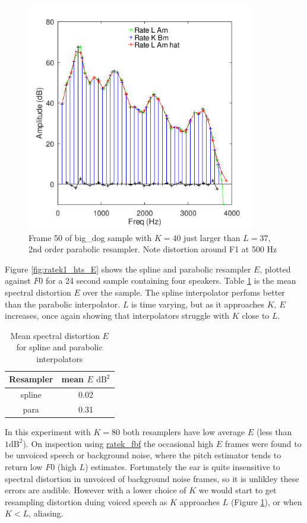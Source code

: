 \documentclass{article}
\begin{document}
\begin{figure}[h]
\caption{Frame 50 of big\_dog sample with $K=40$ just larger than $L=37$, 2nd order parabolic resampler.  Note distortion around F1 at 500 Hz }
\label{fig:ratek1_big_dog_50}
\begin{center}
\includegraphics[width=10cm]{ratek1_big_dog_50}
\end{center}
\end{figure}

Figure \ref{fig:ratek1_hts_E} shows the spline and parabolic resampler $E$, plotted against $F0$ for a 24 second sample containing four speakers.  Table \ref{table:ratek1_mean_E} is the mean spectral distortion $E$ over the sample.  The spline interpolator perfoms better than the parabolic interpolator.  $L$ is time varying, but as it approaches $K$, $E$ increases, once again showing that interpolators struggle with $K$ close to $L$.

\begin{table}[h]
\centering
\begin{tabular}{c c }
 \hline
 Resampler & mean $E$ $\textrm{dB}^2$ \\
 \hline
 spline & 0.02 \\ 
 para  & 0.31 \\
 \hline
\end{tabular}
\caption{Mean spectral distortion $E$ for spline and parabolic interpolators}\label{table:ratek1_mean_E}
\end{table}

In this experiment with $K=80$ both resamplers have low average $E$ (less than $1 \textrm{dB}^2$). On inspection using \url{ratek_fbf} the occasional high $E$ frames were found to be unvoiced speech or background noise, where the pitch estimator tends to return low $F0$ (high $L$) estimates.  Fortunately the ear is quite insensitive to spectral distortion in unvoiced of background noise frames, so it is unlikley these errors are audible.  However with a lower choice of $K$ we would start to get resampling distortion duing voiced speech as $K$ approaches $L$ (Figure \ref{fig:ratek1_big_dog_50}), or when $K<L$, aliasing.
\end{document}
